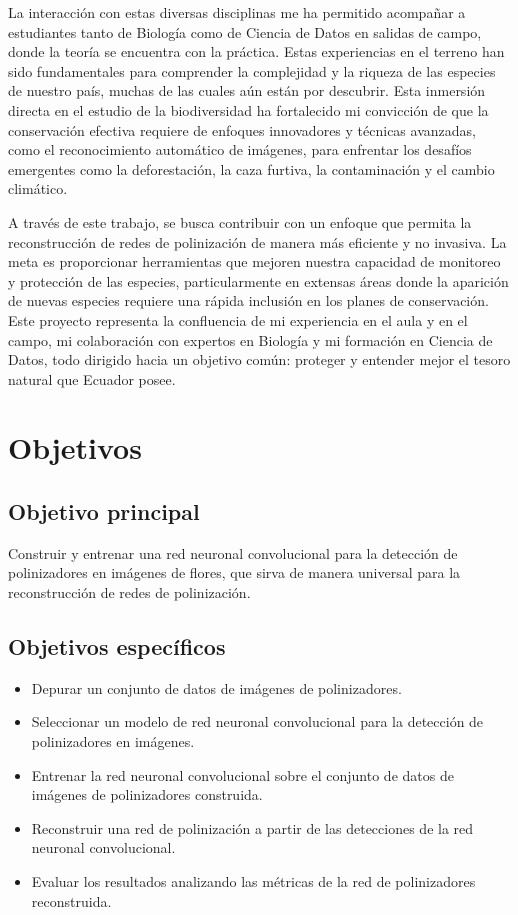 La interacción con estas diversas disciplinas me ha permitido acompañar a estudiantes tanto de Biología como de Ciencia de Datos en salidas de campo, donde la teoría se encuentra con la práctica. Estas experiencias en el terreno han sido fundamentales para comprender la complejidad y la riqueza de las especies de nuestro país, muchas de las cuales aún están por descubrir. Esta inmersión directa en el estudio de la biodiversidad ha fortalecido mi convicción de que la conservación efectiva requiere de enfoques innovadores y técnicas avanzadas, como el reconocimiento automático de imágenes, para enfrentar los desafíos emergentes como la deforestación, la caza furtiva, la contaminación y el cambio climático.

A través de este trabajo, se busca contribuir con un enfoque que permita la reconstrucción de redes de polinización de manera más eficiente y no invasiva. La meta es proporcionar herramientas que mejoren nuestra capacidad de monitoreo y protección de las especies, particularmente en extensas áreas donde la aparición de nuevas especies requiere una rápida inclusión en los planes de conservación. Este proyecto representa la confluencia de mi experiencia en el aula y en el campo, mi colaboración con expertos en Biología y mi formación en Ciencia de Datos, todo dirigido hacia un objetivo común: proteger y entender mejor el tesoro natural que Ecuador posee.

\section{Objetivos}

\subsection{Objetivo principal}

Construir y entrenar una red neuronal convolucional para la detección de polinizadores en imágenes de flores, que sirva de manera universal para la reconstrucción de redes de polinización. 

\subsection{Objetivos específicos}

\begin{itemize}
    \item Depurar un conjunto de datos de imágenes de polinizadores.
    \item Seleccionar un modelo de red neuronal convolucional para la detección de polinizadores en imágenes.
    \item Entrenar la red neuronal convolucional sobre el conjunto de datos de imágenes de polinizadores construida.
    \item Reconstruir una red de polinización a partir de las detecciones de la red neuronal convolucional.
    \item Evaluar los resultados analizando las métricas de la red de polinizadores reconstruida.
\end{itemize}

